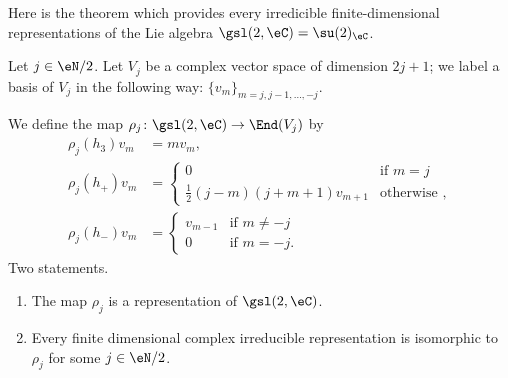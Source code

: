 Here is the theorem which provides every irredicible finite-dimensional representations of the Lie algebra \( \gsl(2,\eC)=\su(2)_{\eC}\).
\begin{theorem}     \label{THOooSRQYooXQDZpT}
	Let \( j\in \eN/2\). Let \( V_j\) be a complex vector space of dimension \( 2j+1\); we label a basis of \( V_j\) in the following way: \( \{ v_m \}_{m=j,j-1,\ldots, -j}\).

	We define the map \( \rho_j\colon \gsl(2,\eC)\to \End(V_j)\) by
	\begin{subequations}
		\begin{align}
			\rho_j(h_3)v_m & =mv_m,                                                 \\
			\rho_j(h_+)v_m & =\begin{cases}
				                  0                                & \text{if } m=j     \\
				                  \frac{ 1 }{2}(j-m)(j+m+1)v_{m+1} & \text{otherwise },
			                  \end{cases} \\
			\rho_j(h_-)v_m & =\begin{cases}
				                  v_{m-1} & \text{if } m\neq -j \\
				                  0       & \text{if } m=-j.
			                  \end{cases}
		\end{align}
	\end{subequations}
	Two statements.
	\begin{enumerate}
		\item
		      The map \( \rho_j\) is a representation of \( \gsl(2,\eC)\).
		\item
		      Every finite dimensional complex irreducible representation is isomorphic to \( \rho_j\) for some \( j\in \eN/2\).
	\end{enumerate}
\end{theorem}

